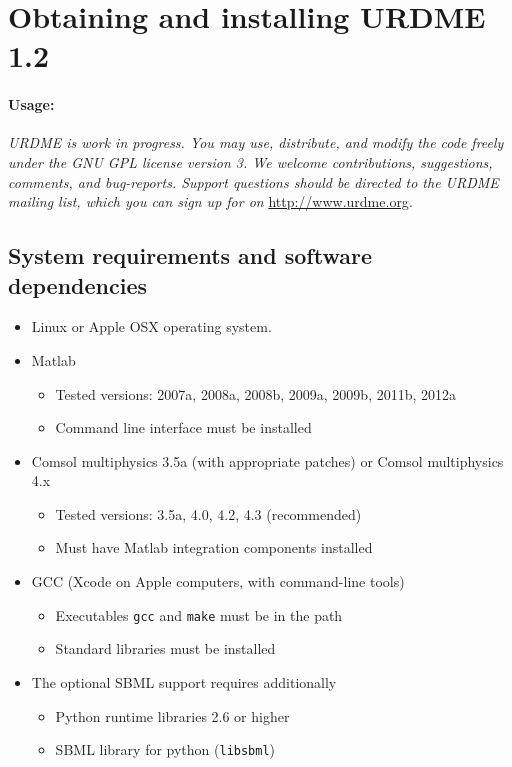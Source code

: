 \section{Obtaining and installing URDME 1.2}
\label{sec:install}

\paragraph{Usage:}

\textit{URDME is work in progress. You may use, distribute, and
 modify the code freely under the GNU GPL license version 3. We welcome
  contributions, suggestions, comments, and bug-reports. Support questions should be directed 
  to the URDME mailing list, which you can sign up for on} \url{http://www.urdme.org}.


\subsection{System requirements and software dependencies}

\begin{itemize}
\item Linux or Apple OSX operating system.
\item Matlab
  \begin{itemize}
  \item Tested versions: 2007a, 2008a, 2008b, 2009a, 2009b, 2011b, 2012a
  \item Command line interface must be installed
  \end{itemize}
\item Comsol multiphysics 3.5a (with appropriate patches) or Comsol multiphysics 4.x
  \begin{itemize}
  \item Tested versions: 3.5a, 4.0, 4.2, 4.3 (recommended)
  \item Must have Matlab integration components installed
  \end{itemize}
\item GCC (Xcode on Apple computers, with command-line tools)
  \begin{itemize}
  \item Executables \texttt{gcc} and \texttt{make} must be in the
    path
  \item Standard libraries must be installed
  \end{itemize}
\item The optional SBML support requires additionally 
  \begin{itemize}
  \item Python runtime libraries 2.6 or higher
  \item SBML library for python (\texttt{libsbml})
  \end{itemize}
\end{itemize}

